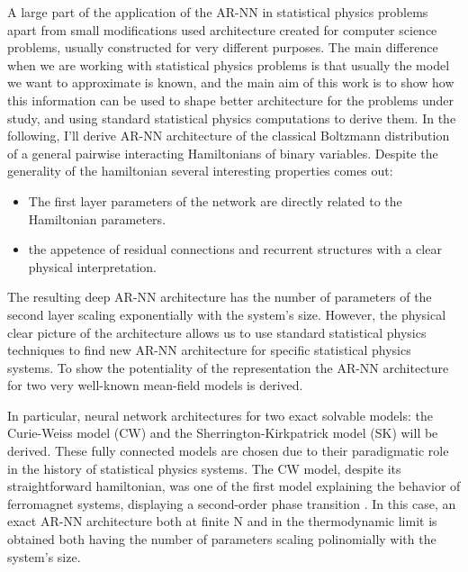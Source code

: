 \documentclass[aps,physrev,10pt,floatfix,reprint]{revtex4-2}
\begin{document}
A large part of the application of the AR-NN in statistical physics problems apart from small modifications used architecture created for computer science problems, usually constructed for very different purposes. The main difference when we are working with statistical physics problems is that usually the model we want to approximate is known, and the main aim of this work is to show how this information can be used to shape better architecture for the problems under study, and using standard statistical physics computations to derive them. In the following, I'll derive AR-NN architecture of the classical Boltzmann distribution of a general pairwise interacting Hamiltonians of binary variables. Despite the generality of the hamiltonian several interesting properties comes out:
\begin{itemize}
    \item The first layer parameters of the network are directly related to the Hamiltonian parameters.
    \item the appetence of residual connections and recurrent structures with a clear physical interpretation.
\end{itemize}
The resulting deep AR-NN architecture has the number of parameters of the second layer scaling exponentially with the system's size. 
However, the physical clear picture of the architecture allows us to use standard statistical physics techniques to find new AR-NN architecture for specific statistical physics systems. To show the potentiality of the representation the AR-NN architecture for two very well-known mean-field models is derived.

In particular, neural network architectures for two exact solvable models: the Curie-Weiss model (CW) and the Sherrington-Kirkpatrick model (SK) will be derived. These fully connected models are chosen due to their paradigmatic role in the history of statistical physics systems. The CW model, despite its straightforward hamiltonian, was one of the first model explaining the behavior of ferromagnet systems, displaying a second-order phase transition \cite{kadanoff2000statistical}. In this case, an exact AR-NN architecture both at finite N and in the thermodynamic limit is obtained both having the number of parameters scaling polinomially with the system's size.
\end{document}
